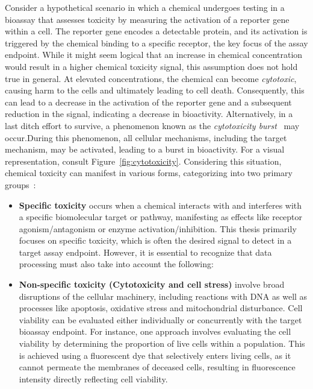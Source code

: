 Consider a hypothetical scenario in which a chemical undergoes testing in a bioassay that assesses toxicity by measuring the activation of a reporter gene within a cell. The reporter gene encodes a detectable protein, and its activation is triggered by the chemical binding to a specific receptor, the key focus of the assay endpoint. While it might seem logical that an increase in chemical concentration would result in a higher chemical toxicity signal, this assumption does not hold true in general. At elevated concentrations, the chemical can become \emph{cytotoxic}, causing harm to the cells and ultimately leading to cell death. Consequently, this can lead to a decrease in the activation of the reporter gene and a subsequent reduction in the signal, indicating a decrease in bioactivity. 
Alternatively, in a last ditch effort to survive, a phenomenon known as the \emph{cytotoxicity burst}~\cite{judson2016} may occur.During this phenomenon, all cellular mechanisms, including the target mechanism, may be activated, leading to a burst in bioactivity. For a visual representation, consult Figure~\ref{fig:cytotoxicity}. Considering this situation, chemical toxicity can manifest in various forms, categorizing into two primary groups~\cite{judson2016}: 
\begin{itemize}
    \item \textbf{Specific toxicity} occurs when a chemical interacts with and interferes with a specific biomolecular target or pathway, manifesting as effects like receptor agonism/antagonism or enzyme activation/inhibition. This thesis primarily focuses on specific toxicity, which is often the desired signal to detect in a target assay endpoint. However, it is essential to recognize that data processing must also take into account the following:
    \item \textbf{Non-specific toxicity (Cytotoxicity and cell stress)} involve broad disruptions of the cellular machinery, including reactions with DNA as well as processes like apoptosis, oxidative stress and mitochondrial disturbance. Cell viability can be evaluated either individually or concurrently with the target bioassay endpoint. For instance, one approach involves evaluating the cell viability by determining the proportion of live cells within a population. This is achieved using a fluorescent dye that selectively enters living cells, as it cannot permeate the membranes of deceased cells, resulting in fluorescence intensity directly reflecting cell viability.
\end{itemize}

